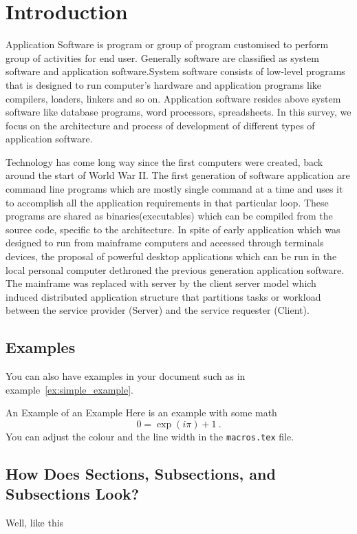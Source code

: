 \chapter{Introduction}\label{ch:introduction}
		Application	Software is program or group of program customised to perform group of activities for end user. Generally software are classified as system software and application software.System software consists of low-level programs that is designed to run computer's hardware and application programs like compilers, loaders, linkers and so on. Application software resides above system software like database programs, word processors, spreadsheets. In this survey, we focus on the architecture and process of development of different types of application software.
			
			Technology has come long way since the first computers were created, back around the start of World War II. The first generation of software application are command line programs which are mostly single command at a time and uses it to accomplish all the application requirements in that particular loop. These programs are shared as binaries(executables) which can be compiled from the source code, specific to the architecture. 
			In spite of early application which was designed to run from mainframe computers and accessed through terminals devices, the proposal of powerful desktop applications which can be run in the local personal computer dethroned the previous generation application software. The mainframe was replaced with server by the client server model which induced distributed application structure that partitions tasks or workload between the service provider (Server) and the service requester (Client).  
			


\section{Examples}
You can also have examples in your document such as in example~\ref{ex:simple_example}.
\begin{example}{An Example of an Example}
  \label{ex:simple_example}
  Here is an example with some math
  \begin{equation}
    0 = \exp(i\pi)+1\ .
  \end{equation}
  You can adjust the colour and the line width in the {\tt macros.tex} file.
\end{example}

\section{How Does Sections, Subsections, and Subsections Look?}
Well, like this
